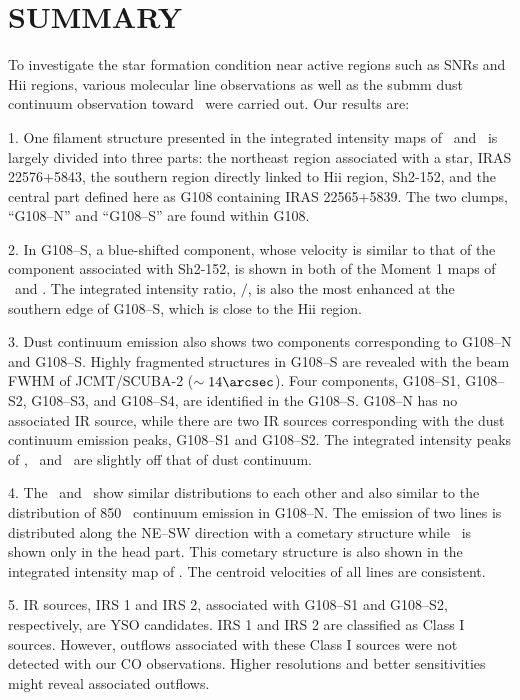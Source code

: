 \documentclass[manuscript]{aastex}
\begin{document}
\section{SUMMARY}

To investigate the star formation condition near active regions such as SNRs and H{\sc ii} regions, various molecular line observations as well as the submm dust continuum observation toward \sou\ were carried out.
Our results are:

1. One filament structure presented in the integrated intensity maps of \tco\ and \thco\ is largely divided into three parts: the northeast region associated with a star, IRAS 22576+5843, the southern region directly linked to H{\sc ii} region, Sh2-152, and the central part defined here as G108 containing IRAS 22565+5839.
The two clumps, ``G108--N'' and ``G108--S'' are found within G108.

2. In G108--S, a blue-shifted component, whose velocity is similar to that of the component associated with Sh2-152, 
is shown in both of the Moment 1 maps of \tcot\ and \thcot.
The integrated intensity ratio, \thcot$/$\thco, is also the most enhanced at the southern edge of G108--S, which is close to the H{\sc ii} region.

3. Dust continuum emission also shows two components corresponding to G108--N and G108--S.
Highly fragmented structures in G108--S are revealed with the beam FWHM of JCMT/SCUBA-2 ($\sim14\arcsec$).
Four components, G108--S1, G108--S2, G108--S3, and G108--S4, are identified in the G108--S.
G108--N has no associated IR source, while there are two IR sources corresponding with the dust continuum emission peaks, G108--S1 and G108--S2.
The integrated intensity peaks of \tcot, \thcot\, and \ceot\ are slightly off that of dust continuum.

4. The \hcop\ and \hcn\ show similar distributions to each other and also similar to the distribution of 850 \m\ continuum emission
in G108--N.
The emission of two lines is distributed along the NE--SW direction with a cometary structure while \hcopf\ is shown only in the head part.
This cometary structure is also shown in the integrated intensity map of \nht.
The centroid velocities of all lines are consistent.


5. IR sources, IRS 1 and IRS 2, associated with G108--S1 and G108--S2, respectively, are YSO candidates.
IRS 1 and IRS 2 are classified as Class I sources.
However, outflows associated with these Class I sources were not detected with our CO observations.
Higher resolutions and better sensitivities might reveal associated outflows.
\end{document}
